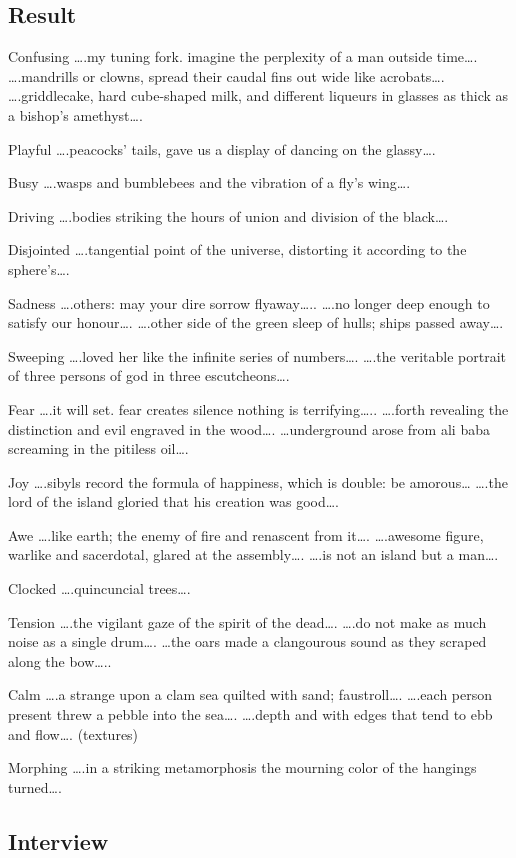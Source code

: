 
\subsection{Result}

Confusing
….my tuning fork. imagine the perplexity of a man outside time….
….mandrills or clowns, spread their caudal fins out wide like acrobats….
….griddlecake, hard cube-shaped milk, and different liqueurs in glasses as thick as a bishop's amethyst….

Playful
….peacocks' tails, gave us a display of dancing on the glassy….

Busy
….wasps and bumblebees and the vibration of a fly's wing….

Driving
….bodies striking the hours of union and division of the black….

Disjointed
….tangential point of the universe, distorting it according to the sphere's….

Sadness
….others: may your dire sorrow flyaway…..
….no longer deep enough to satisfy our honour….
….other side of the green sleep of hulls; ships passed away….

Sweeping
….loved her like the infinite series of numbers….
….the veritable portrait of three persons of god in three escutcheons….

Fear
….it will set. fear creates silence nothing is terrifying…..
….forth revealing the distinction and evil engraved in the wood….
…underground arose from ali baba screaming in the pitiless oil….

Joy
….sibyls record the formula of happiness, which is double: be amorous…
….the lord of the island gloried that his creation was good….

Awe
….like earth; the enemy of fire and renascent from it….
….awesome figure, warlike and sacerdotal, glared at the assembly….
….is not an island but a man….

Clocked
….quincuncial trees….

Tension
….the vigilant gaze of the spirit of the dead….
….do not make as much noise as a single drum….
…the oars made a clangourous sound as they scraped along the bow…..

Calm
….a strange upon a clam sea quilted with sand; faustroll….
….each person present threw a pebble into the sea….
….depth and with edges that tend to ebb and flow….
(textures)

Morphing
….in a striking metamorphosis the mourning color of the hangings turned….


\subsection{Interview}
